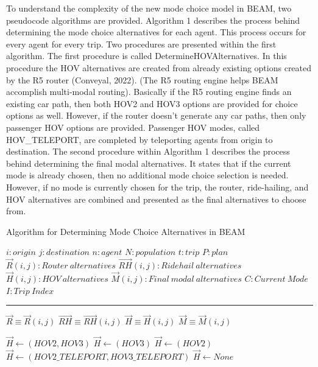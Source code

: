 \documentclass[simple, masters, twoside]{byuthesis}
\begin{document}
To understand the complexity of the new mode choice model in BEAM, two pseudocode algorithms are provided. Algorithm 1 describes the process behind determining the mode choice alternatives for each agent. This process occurs for every agent for every trip. Two procedures are presented within the first algorithm. The first procedure is called DetermineHOVAlternatives. In this procedure the HOV alternatives are created from already existing options created by the R5 router (Conveyal, 2022). (The R5 routing engine helps BEAM accomplish multi-modal routing). Basically if the R5 routing engine finds an existing car path, then both HOV2 and HOV3 options are provided for choice options as well. However, if the router doesn't generate any car paths, then only passenger HOV options are provided. Passenger HOV modes, called HOV\_TELEPORT, are completed by teleporting agents from origin to destination. The second procedure within Algorithm 1 describes the process behind determining the final modal alternatives. It states that if the current mode is already chosen, then no additional mode choice selection is needed. However, if no mode is currently chosen for the trip, the router, ride-hailing, and HOV alternatives are combined and presented as the final alternatives to choose from.

\begin{algorithm} [tph]
\caption{Algorithm for Determining Mode Choice Alternatives in BEAM}
\begin{algorithmic}[1]
\Require
\State $i : origin$
\State $j : destination$
\State $n: agent$
\State $N: population$
\State $t : trip $
\State $P : plan$
\State $\vec{R}(i,j) : Router\: alternatives$
\State $\vec{RH}(i,j) : Ridehail\:alternatives$
\State $\vec{H}(i,j) : HOV\:alternatives$
\State $\vec{M}(i,j) : Final\:modal\:alternatives$
\State $C : Current\:Mode$
\State $I : Trip\:Index$
\vspace{4pt}\hrule\vspace{5pt}

\State $\vec{R} \equiv \vec{R}(i,j)$
\State $\vec{RH} \equiv \vec{RH}(i,j)$
\State $\vec{H} \equiv \vec{H}(i,j)$
\State $\vec{M} \equiv \vec{M}(i,j)$

    \State $\vec{H} \gets (HOV2,HOV3)$
    \State $\vec{H} \gets (HOV3)$
    \State $\vec{H} \gets (HOV2)$
    \State $\vec{H} \gets (HOV2\_TELEPORT, HOV3\_TELEPORT)$
  \EndIf
\Else
  \State $\vec{H} \gets None$
\EndIf
\EndProcedure
\Statex
{}
\end{algorithmic}
\end{algorithm}
\end{document}
